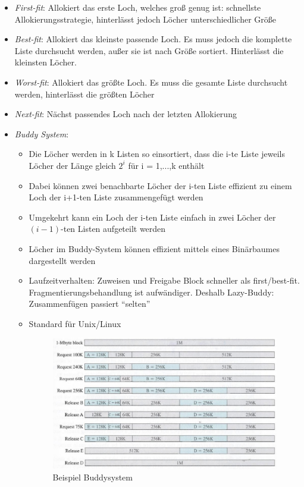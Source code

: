 \documentclass[a4paper]{scrreprt}
\begin{document}
\begin{itemize}
\item \textit{First-fit}: Allokiert das erste Loch, welches groß genug ist: schnellste Allokierungsstrategie, hinterlässt jedoch Löcher unterschiedlicher Größe
\item \textit{Best-fit}: Allokiert das kleinste passende Loch. Es muss jedoch die komplette Liste durchsucht werden, außer sie ist nach Größe sortiert. Hinterlässt die kleinsten Löcher.
\item \textit{Worst-fit}: Allokiert das größte Loch. Es muss die gesamte Liste durchsucht werden, hinterlässt die größten Löcher
\item \textit{Next-fit}: Nächst passendes Loch nach der letzten Allokierung
\item \textit{Buddy System}:
\begin{itemize}
\item Die Löcher werden in k Listen so einsortiert, dass die i-te Liste jeweils Löcher der Länge gleich $2^i$ für i = 1,...,k enthält
\item Dabei können zwei benachbarte Löcher der i-ten Liste effizient zu einem  Loch der i+1-ten Liste zusammengefügt werden
\item Umgekehrt kann ein Loch der i-ten Liste einfach in zwei Löcher der $(i-1)$-ten Listen aufgeteilt werden
\item Löcher im Buddy-System können effizient mittels eines Binärbaumes dargestellt werden
\item Laufzeitverhalten: Zuweisen und Freigabe Block schneller als first/best-fit. Fragmentierungsbehandlung ist aufwändiger. Deshalb Lazy-Buddy: Zusammenfügen passiert "`selten"'
\item Standard für Unix/Linux
\begin{figure}[ht]
\centering
\includegraphics[scale=0.30]{graphics/buddysystem.png}
\caption{Beispiel Buddysystem}
\end{figure}
\end{itemize}
\end{itemize}
\end{document}
